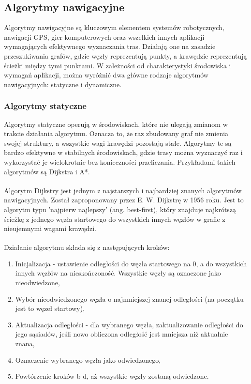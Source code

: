 \documentclass[12pt,twoside]{article}
\begin{document}
\subsection{Algorytmy nawigacyjne}

Algorytmy nawigacyjne są kluczowym elementem systemów robotycznych, nawigacji GPS, gier komputerowych oraz wszelkich innych aplikacji wymagających efektywnego wyznaczania tras. Działają one na zasadzie przeszukiwania grafów, gdzie węzły reprezentują punkty, a krawędzie reprezentują ścieżki między tymi punktami. W zależności od charakterystyki środowiska i wymagań aplikacji, można wyróżnić dwa główne rodzaje algorytmów nawigacyjnych: statyczne i dynamiczne.

\subsubsection{Algorytmy statyczne}

Algorytmy statyczne operują w środowiskach, które nie ulegają zmianom w trakcie działania algorytmu. Oznacza to, że raz zbudowany graf nie zmienia swojej struktury, a wszystkie wagi krawędzi pozostają stałe. Algorytmy te są bardzo efektywne w stabilnych środowiskach, gdzie trasy można wyznaczyć raz i wykorzystać je wielokrotnie bez konieczności przeliczania. Przykładami takich algorytmów są Dijkstra i A*.
\\ \\
Algorytm Dijkstry \cite{DIJKSTRA} jest jednym z najstarszych i najbardziej znanych algorytmów nawigacyjnych. Został zaproponowany przez E. W. Dijkstrę w 1956 roku. Jest to algorytm typu 'najpierw najlepszy' (ang. best-first), który znajduje najkrótszą ścieżkę z jednego węzła startowego do wszystkich innych węzłów w grafie z nieujemnymi wagami krawędzi.
\\ \\

Działanie algorytmu składa się z następujących kroków:

\begin{enumerate}[label=\alph*), leftmargin=1.25cm]
	\item Inicjalizacja - ustawienie odległości do węzła startowego na 0, a do wszystkich innych węzłów na nieskończoność. Wszystkie węzły są oznaczone jako nieodwiedzone,
	\item Wybór nieodwiedzonego węzła o najmniejszej znanej odległości (na początku jest to węzeł startowy),
	\item Aktualizacja odległości - dla wybranego węzła, zaktualizowanie odległości do jego sąsiadów, jeśli nowo obliczona odległość jest mniejsza niż aktualnie znana,
	\item Oznaczenie wybranego węzła jako odwiedzonego,
	\item Powtórzenie kroków b-d, aż wszystkie węzły zostaną odwiedzone.
	
\end{enumerate}
\end{document}
